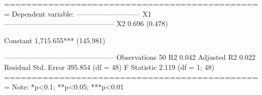 
===============================================
                        Dependent variable:    
                    ---------------------------
                                X1             
-----------------------------------------------
X2                             0.696           
                              (0.478)          
                                               
Constant                   1,715.655***        
                             (145.981)         
                                               
-----------------------------------------------
Observations                    50             
R2                             0.042           
Adjusted R2                    0.022           
Residual Std. Error      395.854 (df = 48)     
F Statistic             2.119 (df = 1; 48)     
===============================================
Note:               *p<0.1; **p<0.05; ***p<0.01
